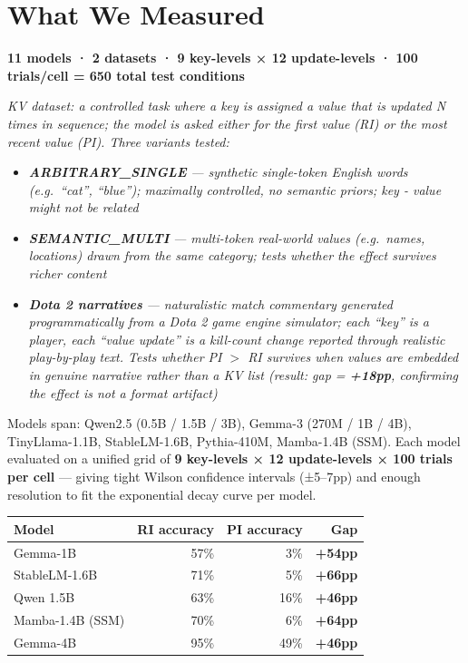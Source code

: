 \documentclass[9pt, a4paper]{article}
\begin{document}
\section*{What We Measured}

\textbf{11 models · 2 datasets · 9 key-levels × 12 update-levels · 100 trials/cell = 650 total test conditions}

\textit{KV dataset: a controlled task where a key is assigned a value that is updated N times in sequence; the model is asked either for the first value (RI) or the most recent value (PI). Three variants tested:}
\begin{itemize}
    \item \textbf{\textit{ARBITRARY\_SINGLE}} \textit{— synthetic single-token English words (e.g.\ ``cat'', ``blue''); maximally controlled, no semantic priors; key - value might not be related}
    \item \textbf{\textit{SEMANTIC\_MULTI}} \textit{— multi-token real-world values (e.g.\ names, locations) drawn from the same category; tests whether the effect survives richer content}
    \item \textbf{\textit{Dota 2 narratives}} \textit{— naturalistic match commentary generated programmatically from a Dota 2 game engine simulator; each ``key'' is a player, each ``value update'' is a kill-count change reported through realistic play-by-play text. Tests whether PI $>$ RI survives when values are embedded in genuine narrative rather than a KV list (result: gap = \textbf{+18pp}, confirming the effect is not a format artifact)}
\end{itemize}

Models span: Qwen2.5 (0.5B / 1.5B / 3B), Gemma-3 (270M / 1B / 4B), TinyLlama-1.1B, StableLM-1.6B, Pythia-410M, Mamba-1.4B (SSM). Each model evaluated on a unified grid of \textbf{9 key-levels × 12 update-levels × 100 trials per cell} — giving tight Wilson confidence intervals (±5–7pp) and enough resolution to fit the exponential decay curve per model.

\vspace{4pt}
\begin{center}
\small
\begin{tabular}{lrrr}
\toprule
\textbf{Model} & \textbf{RI accuracy} & \textbf{PI accuracy} & \textbf{Gap} \\
\midrule
Gemma-1B          & 57\% & 3\%  & \textbf{+54pp} \\
StableLM-1.6B     & 71\% & 5\%  & \textbf{+66pp} \\
Qwen 1.5B         & 63\% & 16\% & \textbf{+46pp} \\
Mamba-1.4B (SSM)  & 70\% & 6\%  & \textbf{+64pp} \\
Gemma-4B          & 95\% & 49\% & \textbf{+46pp} \\
\bottomrule
\end{tabular}
\end{center}
\vspace{2pt}
\end{document}
